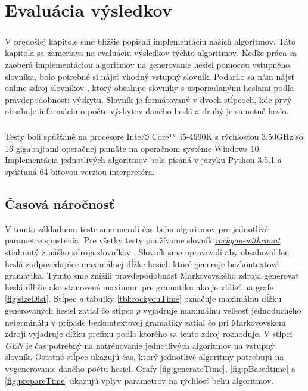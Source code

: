 \chapter{Evaluácia výsledkov}

\paragraph{}
V predošlej kapitole sme bližšie popísali implementáciu našich algoritmov. Táto kapitola sa zameriava na evaluáciu výsledkov týchto algoritmov. Keďže práca sa zaoberá implementáciou algoritmov na generovanie hesiel pomocou vstupného slovníka, bolo potrebné si nájsť vhodný vstupný slovník. Podarilo sa nám nájsť online zdroj slovníkov \cite{dictionaries}, ktorý obsahuje slovníky s usporiadanými heslami podľa pravdepodobnosti výskytu. Slovník je formátovaný v dvoch stĺpcoch, kde prvý obsahuje informáciu o počte výskytov daného heslá a druhý je samotné heslo.

\paragraph{}
Testy boli spúšťané na procesore Intel® Core™ i5-4690K s rýchlosťou 3.50GHz so 16 gigabajtami operačnej pamäte na operačnom systéme Windows 10. Implementácia jednotlivých algoritmov bola písaná v jazyku Python 3.5.1 a spúšťaná 64-bitovou verziou interpretéra.

\section{Časová náročnosť}
\label{sec:time}
V tomto základnom teste sme merali čas behu algoritmov pre jednotlivé parametre spustenia. Pre všetky testy používame slovník \emph{\href{http://downloads.skullsecurity.org/passwords/rockyou-withcount.txt.bz2}{rockyou-withcount}} stiahnutý z nášho zdroja slovníkov \cite{dictionaries}. Slovník sme upravovali aby obsahoval len heslá zodpovedajúce maximálnej dĺžke hesiel, ktoré generuje bezkontextová gramatika. Týmto sme znížili pravdepodobnosť Markovovského zdroja generovať heslá dlhšie ako stanovené maximum pre gramatiku ako je vidieť na grafe \ref{fig:sizeDist}. Stĺpec \emph{d} tabuľky \ref{tbl:rockyouTime} označuje maximálnu dĺžku generovaných hesiel zatiaľ čo stĺpec \emph{p} vyjadruje maximálnu veľkosť jednoduchého neterminálu v prípade bezkontextovej gramatiky zatiaľ čo pri Markovovskom zdroji vyjadruje dĺžku prefixu podľa ktorého sa tento zdroj rozhoduje. V stĺpci \emph{GEN} je čas potrebný na natrénovanie jednotlivých algoritmov na vstupný slovník. Ostatné stĺpce ukazujú čas, ktorý jednotlivé algoritmy potrebujú na vygenerovanie daného počtu hesiel. Grafy \ref{fig:generateTime}, \ref{fig:pBasedtime} a \ref{fig:prepareTime} ukazujú vplyv parametrov na rýchlosť behu algoritmov. 

